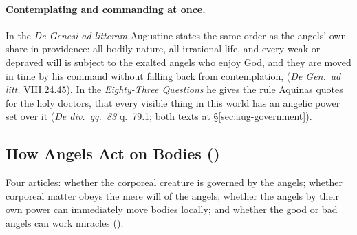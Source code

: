 \paragraph{Contemplating and commanding at once.} In the \emph{De Genesi ad
litteram} Augustine states the same order as the angels' own share in
providence: all bodily nature, all irrational life, and every weak or
depraved will is subject to the exalted angels who enjoy God, and they are
moved in time by his command without falling back from contemplation,
 (\emph{De Gen.\ ad litt.} VIII.24.45). In the
\emph{Eighty-Three Questions} he gives the rule Aquinas quotes for the holy
doctors, that every visible thing in this world has an angelic power set
over it (\emph{De div.\ qq.\ 83} q.~79.1; both texts at
\S\ref{sec:aug-government}).

\sectionguard
\subsection{How Angels Act on Bodies ()}\label{sec:q110}

Four articles: whether the corporeal creature is governed by the angels;
whether corporeal matter obeys the mere will of the angels; whether the
angels by their own power can immediately move bodies locally; and whether
the good or bad angels can work miracles ().

